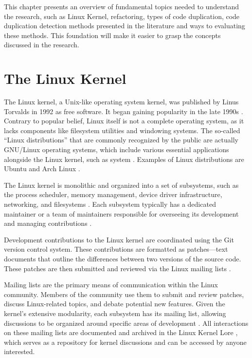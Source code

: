 \en

This chapter presents an overview of fundamental topics needed to understand 
the research, such as Linux Kernel, refactoring, types of code duplication, 
code duplication detection methods presented in the literature and ways to 
evaluating these methods. This foundation will make it easier to grasp the 
concepts discussed in the research.

\section{The Linux Kernel}

The Linux kernel, a Unix-like operating system kernel, was published by Linus
Torvalds in 1992 as free software. It began gaining popularity in the late
1990s \citep{linuxbook}. Contrary to popular belief, Linux itself is not a
complete operating system, as it lacks components like filesystem utilities and
windowing systems. The so-called ``Linux distributions'' that are commonly
recognized by the public are actually GNU/Linux operating systems, which
include various essential applications alongside the Linux kernel,
such as system
\citep{gnuref}. Examples of Linux distributions are Ubuntu \citep{ubuntu} 
and Arch Linux \citep{archlinux}.

The Linux kernel is monolithic and organized into a set of subsystems, such as
the process scheduler, memory management, device driver infrastructure,
networking, and filesystems \citep{melissa}. Each subsystem typically has a
dedicated maintainer or a team of maintainers responsible for overseeing its
development and managing contributions \citep{melissa}.

Development contributions to the Linux kernel are coordinated using the Git
version control system. These contributions are formatted as patches—text
documents that outline the differences between two versions of the source code.
These patches are then submitted and reviewed via the Linux mailing lists
\citep{melissa}.

Mailing lists are the primary means of communication within the Linux
community. Members of the community use them to submit and review patches,
discuss Linux-related topics, and debate potential new features. Given the
kernel's extensive modularity, each subsystem has its mailing list, allowing
discussions to be organized around specific areas of development
\citep{melissa}. All interactions on these mailing lists are documented and
archived in the Linux Kernel Lore \citep{linuxlore}, which serves as a
repository for kernel discussions and can be accessed by anyone interested.

